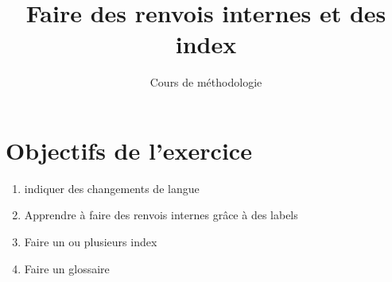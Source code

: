 \documentclass{book}
\title{Faire des renvois internes et des index}
\author{Cours de méthodologie}
\begin{document}
\maketitle

\section*{Objectifs de l'exercice}
\begin{enumerate}
	\item indiquer des changements de langue
  \item Apprendre à faire des renvois internes grâce à des labels

  \item  Faire un ou plusieurs index


\item Faire un glossaire 

\end{enumerate}
\end{document}
